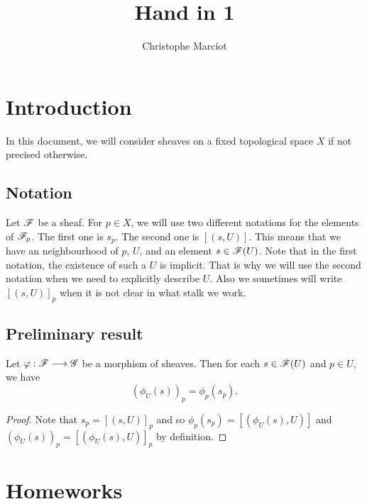 \documentclass[11pt, a4paper, twoside]{article}
\begin{document}
\title{Hand in 1}
\author{Christophe Marciot}
\maketitle

\section{Introduction}
	In this document, we will consider sheaves on a fixed topological space $X$ if not precised otherwise.

\subsection{Notation}
	Let $\mathscr F$ be a sheaf. For $p\in X$, we will use two different notations for the elements of $\mathscr F_p$. The first one is $s_p$. The second one is $[(s,U)]$. This means that we have an neighbourhood of $p$, $U$, and an element $s\in\mathscr F(U)$. Note that in the first notation, the existence of such a $U$ is implicit. That is why we will use the second notation when we need to explicitly describe $U$. Also we sometimes will write $[(s,U)]_p$ when it is not clear in what stalk we work.

\subsection{Preliminary result}
	\begin{prop}
		Let $\varphi:\mathscr F\longrightarrow\mathscr G$ be a morphism of sheaves. Then for each $s\in\mathscr F(U)$ and $p\in U$, we have 
			\begin{displaymath}
				(\phi_U(s))_p=\phi_p(s_p).
			\end{displaymath}
	\end{prop}
	\begin{proof}
		Note that $s_p=[(s,U)]_p$ and so $\phi_p(s_p)=[(\phi_U(s),U)]$ and $(\phi_U(s))_p=[(\phi_U(s),U)]_p$ by definition.
	\end{proof}




\section{Homeworks}
\end{document}
